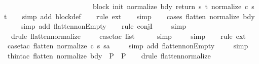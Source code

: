 \begin{isabellebody}
\ \ \ \ \ \ \ \ \ \ \ \ \ \ \ \ \ \ \ \ \ \ \ \ \ block\ init\ {\isacharparenleft}normalize\ bdy{\isacharparenright}\ return\ {\isacharparenleft}{\isasymlambda}s\ t{\isachardot}\ normalize\ {\isacharparenleft}c\ s\ t{\isacharparenright}{\isacharparenright}{\isachardoublequoteclose}\isanewline
%
\isadelimproof
\ \ %
\endisadelimproof
%
\isatagproof
{}\isamarkupfalse%
\ {\isacharparenleft}simp\ add{\isacharcolon}\ block{\isacharunderscore}def{\isacharparenright}\isanewline
\ \ \isamarkupfalse%
\ {\isacharparenleft}rule\ ext{\isacharparenright}\isanewline
\ \ \isamarkupfalse%
\ {\isacharparenleft}simp{\isacharparenright}\isanewline
\ \ \isamarkupfalse%
\ {\isacharparenleft}cases\ {\isachardoublequoteopen}flatten\ {\isacharparenleft}normalize\ bdy{\isacharparenright}{\isachardoublequoteclose}{\isacharparenright}\isanewline
\ \ \isamarkupfalse%
\ \ {\isacharparenleft}simp\ add{\isacharcolon}\ flatten{\isacharunderscore}nonEmpty{\isacharparenright}\isanewline
\ \ \isamarkupfalse%
\ {\isacharparenleft}rule\ conjI{\isacharparenright}\isanewline
\ \ \isamarkupfalse%
\ \ simp\isanewline
\ \ \isamarkupfalse%
\ \ {\isacharparenleft}drule\ flatten{\isacharunderscore}normalize{\isacharparenright}\isanewline
\ \ \isamarkupfalse%
\ \ {\isacharparenleft}case{\isacharunderscore}tac\ list{\isacharparenright}\isanewline
\ \ \isamarkupfalse%
\ \ \ simp\isanewline
\ \ \isamarkupfalse%
\ \ simp\isanewline
\ \ \isamarkupfalse%
\ {\isacharparenleft}rule\ ext{\isacharparenright}\isanewline
\ \ \isamarkupfalse%
\ {\isacharparenleft}case{\isacharunderscore}tac\ {\isachardoublequoteopen}flatten\ {\isacharparenleft}normalize\ {\isacharparenleft}c\ s\ sa{\isacharparenright}{\isacharparenright}{\isachardoublequoteclose}{\isacharparenright}\isanewline
\ \ \isamarkupfalse%
\ \ {\isacharparenleft}simp\ add{\isacharcolon}\ flatten{\isacharunderscore}nonEmpty{\isacharparenright}\isanewline
\ \ \isamarkupfalse%
\ \ simp\isanewline
\ \ \isamarkupfalse%
\ {\isacharparenleft}thin{\isacharunderscore}tac\ {\isachardoublequoteopen}flatten\ {\isacharparenleft}normalize\ bdy{\isacharparenright}\ {\isacharequal}\ P{\isachardoublequoteclose}\ \ P{\isacharparenright}\isanewline
\ \ \isamarkupfalse%
\ {\isacharparenleft}drule\ flatten{\isacharunderscore}normalize{\isacharparenright}\isanewline

\end{isabellebody}
